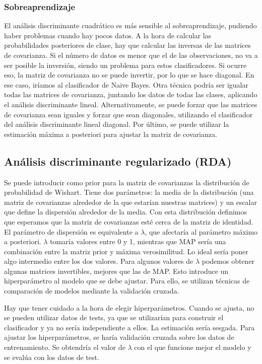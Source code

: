 \subsubsection{Sobreaprendizaje}
El análisis discriminante cuadrático es más sensible al sobreaprendizaje, pudiendo haber problemas cuando hay pocos datos. A la hora de calcular las probabilidades posteriores de clase, hay que calcular las inversas de las matrices de covarianza. Si el número de datos es menor que el de las observaciones, no va a ser posible la inversión, siendo un problema para estos clasificadores. Si ocurre eso, la matriz de covarianza no se puede invertir, por lo que se hace diagonal. En ese caso, iríamos al clasificador de Naive Bayes. Otra técnica podría ser igualar todas las matrices de covarianza, juntando los datos de todas las clases, aplicando el análisis discriminante lineal. Alternativamente, se puede forzar que las matrices de covarianza sean iguales y forzar que sean diagonales, utilizando el clasificador del análisis discriminante lineal diagonal. Por último, se puede utilizar la estimación máxima a posteriori para ajustar la matriz de covarianza. 

\subsection{Análisis discriminante regularizado (RDA)}
Se puede introducir como prior para la matriz de covarianzas la distribución de probabilidad de Wishart. Tiene dos parámetros: la media de la distribución (una matriz de covarianzas alrededor de la que estarían nuestras matrices) y un escalar que define la dispersión alrededor de la media. Con esta distribución definimos que esperamos que la matriz de covarianzas esté cerca de la matriz de identidad. El parámetro de dispersión es equivalente a $\lambda$, que afectaría al parámetro máximo a posteriori. $\lambda$ tomaría valores entre 0 y 1, mientras que MAP sería una combinación entre la matriz prior y máxima verosimilitud. Lo ideal sería poner algo intermedio entre los dos valores. Para algunos valores de $\lambda$ podemos obtener algunas matrices invertibles, mejores que las de MAP. Esto introduce un hiperparámetro al modelo que se debe ajustar. Para ello, se utilizan técnicas de comparación de modelos mediante la validación cruzada. 

Hay que tener cuidado a la hora de elegir hiperparámetros. Cuando se ajusta, no se pueden utilizar datos de tests, ya que se utilizarían para construir el clasificador y ya no sería independiente a ellos. La estimación sería sesgada. Para ajustar los hiperparámetros, se haría validación cruzada sobre los datos de entrenamiento. Se obtendría el valor de $\lambda$ con el que funcione mejor el modelo y se evalúa con los datos de test.

